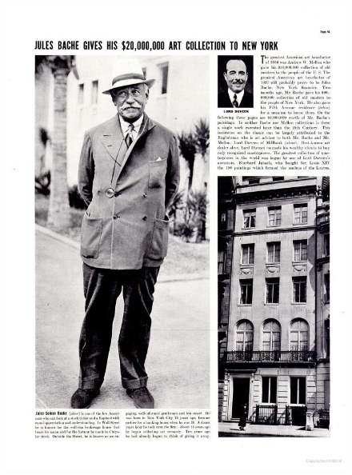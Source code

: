 \begin{figure}

\centering
\includegraphics[height=\textheight, width=\textwidth, keepaspectratio]{./images/julesbache.jpg}
\end{figure}


